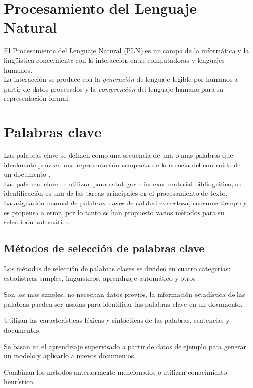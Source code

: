 \section{Procesamiento del Lenguaje Natural}
El Procesamiento del Lenguaje Natural (PLN) es un campo de la inform\'atica y la 
ling\"uistica concerniente con la interacci\'on entre computadoras y lenguajes
humanos. \\

La interacci\'on se produce con la \emph{generaci\'on} de lenguaje legible por humanos
a partir de datos procesados y la \emph{comprensi\'on} del lenguaje humano para su
representaci\'on formal.

\section{Palabras clave}
Las palabras clave se definen como una secuencia de una o mas palabras que idealmente
proveen una representaci\'on compacta de la esencia del contenido de un 
documento \cite{REC10}. \\

Las palabras clave se utilizan para catalogar e indexar material bibliogr\'afico,
su identificaci\'on es una de las tareas principales en el procesamiento de texto. \\

La asignaci\'on manual de palabras claves de calidad es costosa, consume tiempo y es
propensa a error, por lo tanto se han propuesto varios m\'etodos para su seleccio\'on
autom\'atica.

\subsection{M\'etodos de selecci\'on de palabras clave}
Los m\'etodos de selecci\'on de palabras claves se dividen en cuatro categor\'ias:
estad\'isticas simples, ling\"uisticos, aprendizaje autom\'atico y otros \cite{ZWW08}.
\begin{description}[leftmargin=0cm]
	\item[Enfoques estad\'isticos] Son los mas simples, no necesitan datos previos,
	la informaci\'on estad\'istica de las palabras pueden ser usadas para identificar
	las palabras clave en un documento.
	\item[Enfoques ling\"uisticos] Utilizan las caracter\'isticas l\'exicas y
	sint\'acticas de las palabras, sentencias y documentos.
	\item[Enfoques de aprendizaje autom\'atico] Se basan en el aprendizaje supervisado
	a partir de datos de ejemplo para generar un modelo y aplicarlo a nuevos
	documentos.
	\item[Otros enfoques] Combinan los m\'etodos anteriormente mencionados o utilizan
	conocimiento heur\'istico.
\end{description}

